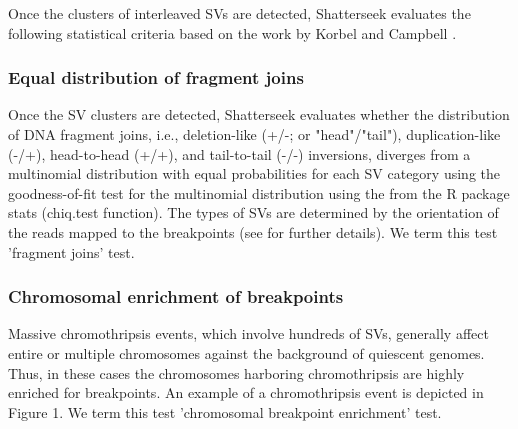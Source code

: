 \documentclass[twoside,a4wide,11pt]{article}\usepackage[]{graphicx}\usepackage[]{color}
\begin{document}
Once the clusters of interleaved SVs are detected, Shatterseek evaluates the following statistical criteria based on the work by Korbel and Campbell \cite{Korbel2013}.


\subsubsection{Equal distribution of fragment joins}

Once the SV clusters are detected, Shatterseek evaluates whether the distribution of DNA fragment joins,
i.e., deletion-like (+/-; or "head"/"tail"), duplication-like (-/+), head-to-head (+/+), and tail-to-tail (-/-) inversions,
diverges from a multinomial distribution with equal probabilities for each SV category using the goodness-of-fit test for the multinomial distribution using the from the R package stats (chiq.test function).
The types of SVs are determined by the orientation of the reads mapped to the breakpoints (see \cite{Zhang2013} for further details).
We term this test 'fragment joins' test.

\subsubsection{Chromosomal enrichment of breakpoints}
Massive chromothripsis events, which involve hundreds of SVs,
generally affect entire or multiple chromosomes against the background of 
quiescent genomes.
Thus, in these cases the chromosomes harboring chromothripsis are highly enriched for breakpoints.
An example of a chromothripsis event is depicted in Figure 1.
We term this test 'chromosomal breakpoint enrichment' test.
\end{document}
